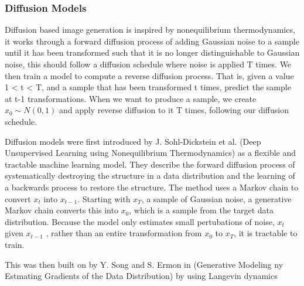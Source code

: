 \documentclass{UoYCSproject}
\begin{document}

\subsubsection{Diffusion Models}


Diffusion based image generation is inspired by nonequilibrium thermodynamics, it works through a forward diffusion process of adding Gaussian noise to a sample until it has been transformed such that it is no longer distinguishable to Gaussian noise, this should follow a diffusion schedule where noise is applied T times. We then train a model to compute a reverse diffusion process. That is, given a value 1 < t < T, and a sample that has been transformed t times, predict the sample at t-1 transformations. When we want to produce a sample, we create $ x_0 \sim N(0,1) $ and apply reverse diffusion to it T times, following our diffusion schedule. 

Diffusion models were first introduced by J. Sohl-Dickstein et al. (Deep Unsupervised Learning using Nonequilibrium Thermodynamics) as a flexible and tractable machine learning model. They describe the forward diffusion process of systematically destroying the structure in a data distribution and the learning of a backwards process to restore the structure. The method uses a Markov chain to convert $ x_t $ into $ x_{t-1} $. Starting with $ x_T $, a sample of Gaussian noise, a generative Markov chain converts this into $ x_0 $, which is a sample from the target data distribution. Because the model only estimates small pertubations of noise, $ x_t $ given $ x_{t-1} $ , rather than an entire transformation from $ x_0 $ to $ x_T $, it is tractable to train. 

This was then built on by Y. Song and S. Ermon in (Generative Modeling ny Estmating Gradients of the Data Distribution) by using Langevin dynamics 
\end{document}
